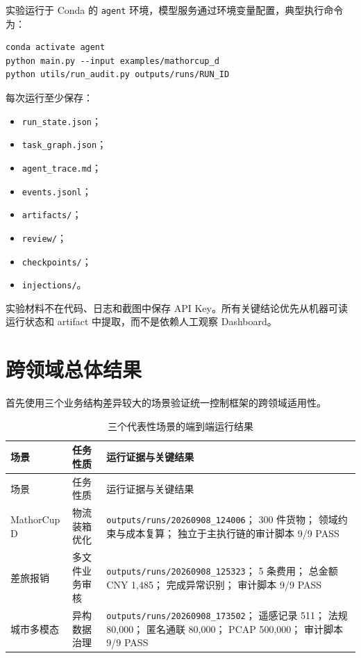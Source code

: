 \documentclass[UTF8,a4paper,12pt,oneside]{ctexbook}
\begin{document}
实验运行于 Conda 的 \texttt{agent} 环境，模型服务通过环境变量配置，典型执行命令为：

\begin{lstlisting}
conda activate agent
python main.py --input examples/mathorcup_d
python utils/run_audit.py outputs/runs/RUN_ID
\end{lstlisting}

每次运行至少保存：

\begin{itemize}
    \item \texttt{run\_state.json}；
    \item \texttt{task\_graph.json}；
    \item \texttt{agent\_trace.md}；
    \item \texttt{events.jsonl}；
    \item \texttt{artifacts/}；
    \item \texttt{review/}；
    \item \texttt{checkpoints/}；
    \item \texttt{injections/}。
\end{itemize}

实验材料不在代码、日志和截图中保存 API Key。所有关键结论优先从机器可读运行状态和 artifact 中提取，而不是依赖人工观察 Dashboard。


\section{跨领域总体结果}

首先使用三个业务结构差异较大的场景验证统一控制框架的跨领域适用性。

\begin{longtable}{p{}p{}p{}}
\caption{三个代表性场景的端到端运行结果}
\label{tab:cross-domain-overall-results}\\
\toprule
场景 & 任务性质 & 运行证据与关键结果\\
\midrule
\endfirsthead

\toprule
场景 & 任务性质 & 运行证据与关键结果\\
\midrule
\endhead

MathorCup D
&
物流装箱优化
&
\texttt{outputs/runs/20260908\_124006}；
300 件货物；
领域约束与成本复算；
独立于主执行链的审计脚本 9/9 PASS
\\

差旅报销
&
多文件业务审核
&
\texttt{outputs/runs/20260908\_125323}；
5 条费用；
总金额 CNY 1,485；
完成异常识别；
审计脚本 9/9 PASS
\\

城市多模态
&
异构数据治理
&
\texttt{outputs/runs/20260908\_173502}；
遥感记录 511；
法规 80,000；
匿名通联 80,000；
PCAP 500,000；
审计脚本 9/9 PASS
\\

\bottomrule
\end{longtable}
\end{document}
